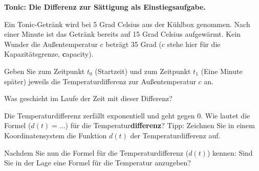 \newpage

\bbwActAufgabenNr{} \textbf{Tonic: Die Differenz zur Sättigung als Einstiegsaufgabe.}

Ein Tonic-Getränk wird bei 5 Grad Celsius aus der Kühlbox genommen.
Nach einer Minute ist das Getränk bereits auf 15 Grad Celsius
aufgewärmt.
Kein Wunder die Außentemperatur $c$ beträgt 35 Grad ($c$ stehe hier
für die Kapazitätsgrenze, \textbf{c}apacity). 

\begin{bbwAufgabenBlock}

\item Geben Sie zum Zeitpunkt $t_0$ (Startzeit) und zum Zeitpunkt
  $t_1$ (Eine Minute später) jeweils die Temperaturdifferenz zur
  Außentemperatur $c$ an.


\item Was geschieht im Laufe der Zeit mit dieser Differenz?


\item Die Temperaturdifferenz zerfällt exponentiell und geht gegen 0.
  Wie lautet die Formel ($d(t)=...$) für die Temperatur\textbf{differenz}? Tipp:
  Zeichnen Sie in einem Koordinatensystem die Funktion $d(t)$ der
  Temperaturdifferenz auf.


\item Nachdem Sie nun die Formel für die Temperaturdifferenz ($d(t)$) kennen:
  Sind Sie in der Lage eine Formel für die Temperatur anzugeben?

  

\end{bbwAufgabenBlock}


\platzFuerBerechnungenBisEndeSeite{}

